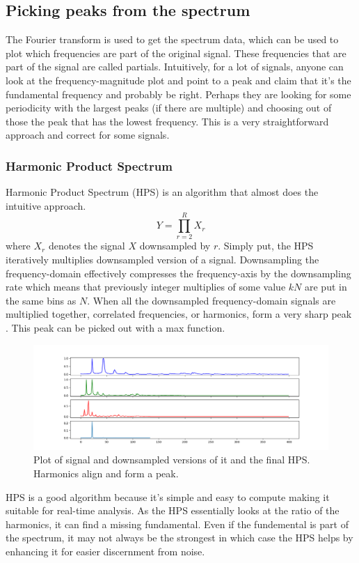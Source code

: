 \subsection{Picking peaks from the spectrum}
The Fourier transform is used to get the spectrum data, which can be used to plot which frequencies are part of the original signal. These frequencies that are part of the signal are called partials. Intuitively, for a lot of signals, anyone can look at the frequency-magnitude plot and point to a peak and claim that it's the fundamental frequency and probably be right. Perhaps they are looking for some periodicity with the largest peaks (if there are multiple) and choosing out of those the peak that has the lowest frequency. This is a very straightforward approach and correct for some signals. 

\subsubsection{Harmonic Product Spectrum}
Harmonic Product Spectrum (HPS) is an algorithm that almost does the intuitive approach. 
$$Y = \prod_{r=2}^R X_r$$ where $X_r$ denotes the signal $X$ downsampled by $r$. Simply put, the HPS iteratively multiplies downsampled version of a signal. Downsampling the frequency-domain effectively compresses the frequency-axis by the downsampling rate which means that previously integer multiplies of some value $kN$ are put in the same bins as $N$. When all the downsampled frequency-domain signals are multiplied together, correlated frequencies, or harmonics, form a very sharp peak \cite{McLeod2008}. This peak can be picked out with a max function.

\begin{figure}[ht]
    \centering
    \includegraphics[width=\textwidth]{./images/hps.png}
    \caption{Plot of signal and downsampled versions of it and the final HPS. Harmonics align and form a peak. \label{fig:hps}}
\end{figure}

HPS is a good algorithm because it's simple and easy to compute making it suitable for real-time analysis. As the HPS essentially looks at the ratio of the harmonics, it can find a missing fundamental. Even if the fundemental is part of the spectrum, it may not always be the strongest in which case the HPS helps by enhancing it for easier discernment from noise.

